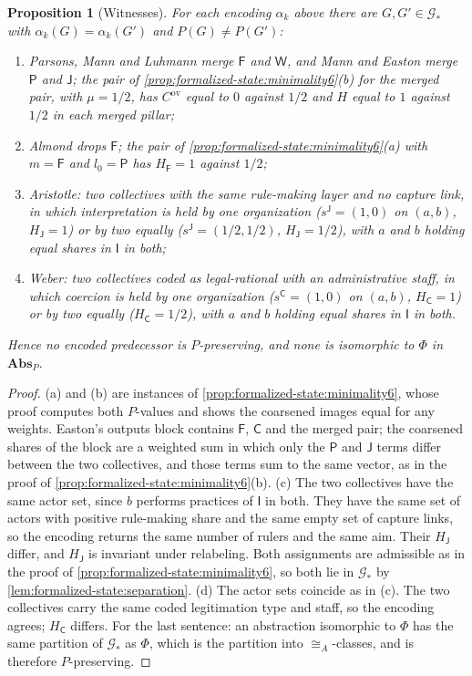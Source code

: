 \documentclass[11pt,letterpaper]{article}
\newtheorem{proposition}[theorem]{Proposition}
\theoremstyle{definition}
\theoremstyle{remark}
\newcommand{\pF}{\mathsf{F}}
\newcommand{\pP}{\mathsf{P}}
\newcommand{\pJ}{\mathsf{J}}
\newcommand{\pI}{\mathsf{I}}
\newcommand{\pC}{\mathsf{C}}
\newcommand{\pW}{\mathsf{W}}
\newcommand{\ov}{\mathrm{ov}}
\begin{document}
\begin{proposition}[Witnesses]
\label{prop:formalized-state:witnesses}
For each encoding $\alpha_k$ above there are $G,G'\in\mathcal{G}_*$ with $\alpha_k(G)=\alpha_k(G')$ and $P(G)\neq P(G')$:
\begin{enumerate}[label=(\alph*)]
\item Parsons, Mann and Luhmann merge $\pF$ and $\pW$, and Mann and Easton merge $\pP$ and $\pJ$; the pair of \cref{prop:formalized-state:minimality6}(b) for the merged pair, with $\mu=1/2$, has $C^{\ov}$ equal to $0$ against $1/2$ and $H$ equal to $1$ against $1/2$ in each merged pillar;
\item Almond drops $\pF$; the pair of \cref{prop:formalized-state:minimality6}(a) with $m=\pF$ and $l_0=\pP$ has $H_{\pF}=1$ against $1/2$;
\item Aristotle: two collectives with the same rule-making layer and no capture link, in which interpretation is held by one organization ($s^{\pJ}=(1,0)$ on $(a,b)$, $H_{\pJ}=1$) or by two equally ($s^{\pJ}=(1/2,1/2)$, $H_{\pJ}=1/2$), with $a$ and $b$ holding equal shares in $\pI$ in both;
\item Weber: two collectives coded as legal-rational with an administrative staff, in which coercion is held by one organization ($s^{\pC}=(1,0)$ on $(a,b)$, $H_{\pC}=1$) or by two equally ($H_{\pC}=1/2$), with $a$ and $b$ holding equal shares in $\pI$ in both.
\end{enumerate}
Hence no encoded predecessor is $P$-preserving, and none is isomorphic to $\Phi$ in $\mathbf{Abs}_P$.
\end{proposition}

\begin{proof}
(a) and (b) are instances of \cref{prop:formalized-state:minimality6}, whose proof computes both $P$-values and shows the coarsened images equal for any weights. Easton's outputs block contains $\pF$, $\pC$ and the merged pair; the coarsened shares of the block are a weighted sum in which only the $\pP$ and $\pJ$ terms differ between the two collectives, and those terms sum to the same vector, as in the proof of \cref{prop:formalized-state:minimality6}(b). (c) The two collectives have the same actor set, since $b$ performs practices of $\pI$ in both. They have the same set of actors with positive rule-making share and the same empty set of capture links, so the encoding returns the same number of rulers and the same aim. Their $H_{\pJ}$ differ, and $H_{\pJ}$ is invariant under relabeling. Both assignments are admissible as in the proof of \cref{prop:formalized-state:minimality6}, so both lie in $\mathcal{G}_*$ by \cref{lem:formalized-state:separation}. (d) The actor sets coincide as in (c). The two collectives carry the same coded legitimation type and staff, so the encoding agrees; $H_{\pC}$ differs. For the last sentence: an abstraction isomorphic to $\Phi$ has the same partition of $\mathcal{G}_*$ as $\Phi$, which is the partition into $\cong_A$-classes, and is therefore $P$-preserving.
\end{proof}
\end{document}
